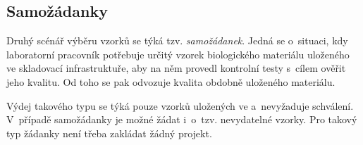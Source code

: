 \documentclass[11pt,draft,oneside]{fithesis2}
\begin{document}
\subsection{Samožádanky}
Druhý scénář výběru vzorků se týká tzv. \textit{samožádanek}. Jedná se o~situaci, kdy laboratorní pracovník potřebuje určitý vzorek biologického materiálu uloženého ve skladovací infrastruktuře, aby na něm provedl kontrolní testy s~cílem ověřit jeho kvalitu. Od toho se pak odvozuje kvalita obdobně uloženého materiálu. 

Výdej takového typu se týká pouze vzorků uložených ve  a~nevyžaduje schválení. V~případě samožádanky je možné žádat i~o~tzv. nevydatelné vzorky. Pro takový typ žádanky není třeba zakládat žádný projekt.
\end{document}
